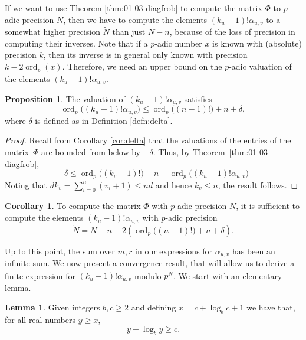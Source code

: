 \documentclass[a4paper,11pt]{article}
\numberwithin{equation}{section}
\DeclareMathOperator{\ord}{ord}          %
\theoremstyle{definition}
\newtheorem{lem}[thm]{Lemma}
\newtheorem{prop}[thm]{Proposition}
\newtheorem{cor}[thm]{Corollary}
\begin{document}
If we want to use Theorem \ref{thm:01-03-diagfrob} to compute the matrix 
$\Phi$ to $p$-adic precision $N$, then we have to compute the elements
$(k_u-1)!\alpha_{u,v}$ to a somewhat higher precision $\tilde{N}$ than just
$N-n$, because 
of the loss of precision in computing their inverses. Note that if a $p$-adic 
number $x$ is known with (absolute) precision $k$, then its inverse is in general 
only known with precision $k-2\ord_p(x)$. Therefore, we need an upper bound
on the $p$-adic valuation of the elements $(k_u-1)!\alpha_{u,v}$.

\begin{prop}
The valuation of $(k_u-1)! \alpha_{u,v}$ satisfies
\begin{equation*}
\ord_p\bigl((k_u-1)! \alpha_{u,v}\bigr) 
    \leq \ord_p\bigl((n-1)!\bigr) + n + \delta,
\end{equation*}
where $\delta$ is defined as in Definition \ref{defn:delta}. 
\end{prop}

\begin{proof}
Recall from Corollary \ref{cor:delta} that the valuations 
of the entries of the matrix~$\Phi$ are bounded from below by $-\delta$. 
Thus, by Theorem~\ref{thm:01-03-diagfrob}, 
\begin{equation*}
-\delta \leq \ord_p\bigl((k_v-1)!\bigr) + n 
           - \ord_p\bigl((k_u-1)! \alpha_{u,v}\bigr)
\end{equation*}
Noting that $d k_v = \sum_{i=0}^n (v_i + 1) \leq n d$ and 
hence $k_v \leq n$, the result follows.
\end{proof}

\begin{cor} \label{cor:Ntilde}
To compute the matrix $\Phi$ with $p$-adic precision $N$, it is sufficient to compute the elements 
$(k_u-1)!\alpha_{u,v}$ with $p$-adic precision
\begin{equation*}
\tilde{N}=N-n+2(\ord_p\bigl((n-1)!\bigr)+n+\delta).
\end{equation*}
\end{cor}

Up to this point, the sum over $m,r$ in our expressions 
for $\alpha_{u,v}$ has been an infinite sum.  We now present 
a convergence result, that will allow us to derive a finite 
expression for $(k_u-1)!\alpha_{u,v}$ modulo $p^{\tilde{N}}$. We
start with an elementary lemma.

\begin{lem} \label{lem:log}
Given integers $b,c \geq 2$ and defining $x = c + \log_b c + 1$ 
we have that, for all real numbers $y \geq x$, 
\begin{equation*}
y - \log_b y \geq c.
\end{equation*}
\end{lem}
\end{document}
